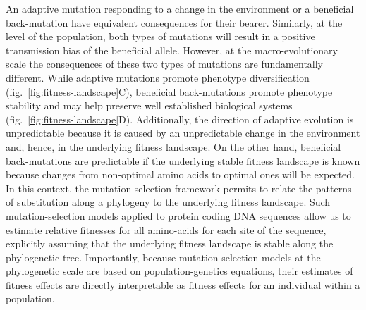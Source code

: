\documentclass{article}
\begin{document}
    An adaptive mutation responding to a change in the environment or a beneficial back-mutation have equivalent consequences for their bearer\cite{charlesworth_other_2007}.
    Similarly, at the level of the population, both types of mutations will result in a positive transmission bias of the beneficial allele.
    However, at the macro-evolutionary scale the consequences of these two types of mutations are fundamentally different.
    While adaptive mutations promote phenotype diversification (fig.~\ref{fig:fitness-landscape}C), beneficial back-mutations promote phenotype stability and may help preserve well established biological systems (fig.~\ref{fig:fitness-landscape}D).
    Additionally, the direction of adaptive evolution is unpredictable because it is caused by an unpredictable change in the environment and, hence, in the underlying fitness landscape\cite{bazykin_changing_2015}.
    On the other hand, beneficial back-mutations are predictable if the underlying stable fitness landscape is known because changes from non-optimal amino acids to optimal ones will be expected.
    In this context, the mutation-selection framework permits to relate the patterns of substitution along a phylogeny to the underlying fitness landscape\cite{halpern_evolutionary_1998, mccandlish_modeling_2014}.
    Such mutation-selection models applied to protein coding DNA sequences allow us to estimate relative fitnesses for all amino-acids for each site of the sequence, explicitly assuming that the underlying fitness landscape is stable along the phylogenetic tree\cite{rodrigue_mechanistic_2010, tamuri_estimating_2012, rodrigue_detecting_2017}.
    Importantly, because mutation-selection models at the phylogenetic scale are based on population-genetics equations, their estimates of fitness effects are directly interpretable as fitness effects for an individual within a population.
\end{document}
